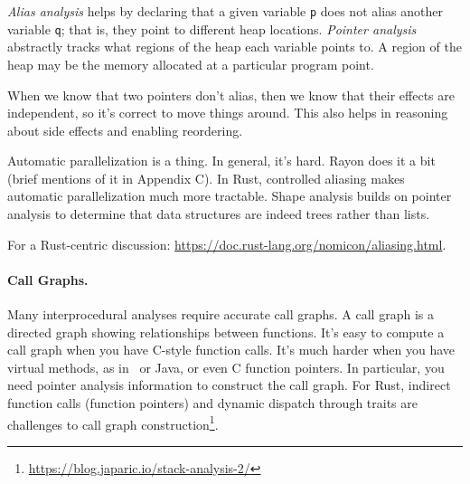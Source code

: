 \emph{Alias analysis} helps by declaring that a
given variable {\tt p} does not alias another variable {\tt q}; that
is, they point to different heap locations. \emph{Pointer analysis}
abstractly tracks what regions of the heap each variable points to.
A region of the heap may be the memory allocated at a particular
program point.

When we know that two pointers don't alias, then we know that their
effects are independent, so it's correct to move things around.
This also helps in reasoning about side effects and enabling reordering.

Automatic parallelization is a thing. In general, it's hard. Rayon does it a bit
(brief mentions of it in Appendix C).
In Rust, controlled aliasing makes automatic parallelization much more tractable.
Shape analysis
builds on pointer analysis to determine that data structures are indeed
trees rather than lists.

For a Rust-centric discussion: \url{https://doc.rust-lang.org/nomicon/aliasing.html}.

\paragraph{Call Graphs.} Many interprocedural analyses require accurate
call graphs. A call graph is a directed graph showing relationships between
functions. It's easy to compute a call graph when you have C-style
function calls. It's much harder when you have virtual methods, as in
\CPP~or Java, or even C function pointers. In particular, you need pointer
analysis information to construct the call graph. For Rust, indirect function
calls (function pointers) and dynamic dispatch through traits are challenges
to call graph construction\footnote{\url{https://blog.japaric.io/stack-analysis-2/}}.

